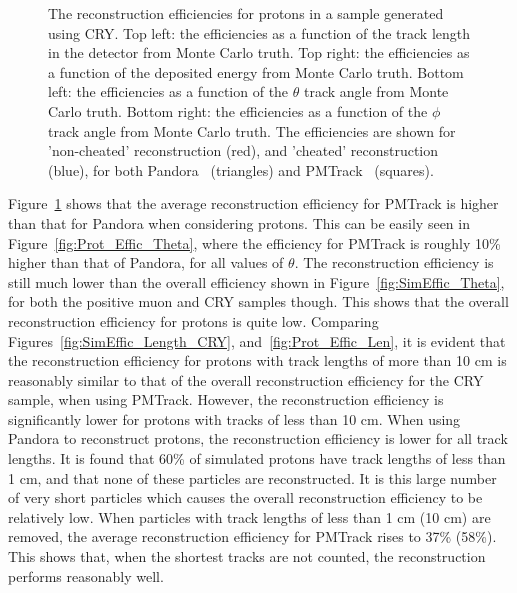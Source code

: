 \begin{figure}
  \caption[The reconstruction efficiencies for protons in a sample generated using CRY.]
          {The reconstruction efficiencies for protons in a sample generated using CRY. Top left: the efficiencies as a function of the track length in the detector from Monte Carlo truth. Top right: the efficiencies as a function of the deposited energy from Monte Carlo truth. Bottom left: the efficiencies as a function of the $\theta$ track angle from Monte Carlo truth. Bottom right: the efficiencies as a function of the $\phi$ track angle from Monte Carlo truth. The efficiencies are shown for 'non-cheated' reconstruction (red), and 'cheated' reconstruction (blue), for both Pandora~\citep{Pandora} (triangles) and PMTrack~\citep{PMTrack} (squares).}
  \label{fig:Prot_Effic}
\end{figure}

Figure~\ref{fig:Prot_Effic} shows that the average reconstruction efficiency for PMTrack is higher than that for Pandora when considering protons. This can be easily seen in Figure~\ref{fig:Prot_Effic_Theta}, where the efficiency for PMTrack is roughly 10\% higher than that of Pandora, for all values of $\theta$. The reconstruction efficiency is still much lower than the overall efficiency shown in Figure~\ref{fig:SimEffic_Theta}, for both the positive muon and CRY samples though. This shows that the overall reconstruction efficiency for protons is quite low. Comparing Figures~\ref{fig:SimEffic_Length_CRY}, and~\ref{fig:Prot_Effic_Len}, it is evident that the reconstruction efficiency for protons with track lengths of more than 10 cm is reasonably similar to that of the overall reconstruction efficiency for the CRY sample, when using PMTrack. However, the reconstruction efficiency is significantly lower for protons with tracks of less than 10 cm. When using Pandora to reconstruct protons, the reconstruction efficiency is lower for all track lengths. It is found that 60\% of simulated protons have track lengths of less than 1 cm, and that none of these particles are reconstructed. It is this large number of very short particles which causes the overall reconstruction efficiency to be relatively low. When particles with track lengths of less than 1 cm (10 cm) are removed, the average reconstruction efficiency for PMTrack rises to 37\% (58\%). This shows that, when the shortest tracks are not counted, the reconstruction performs reasonably well. \\


